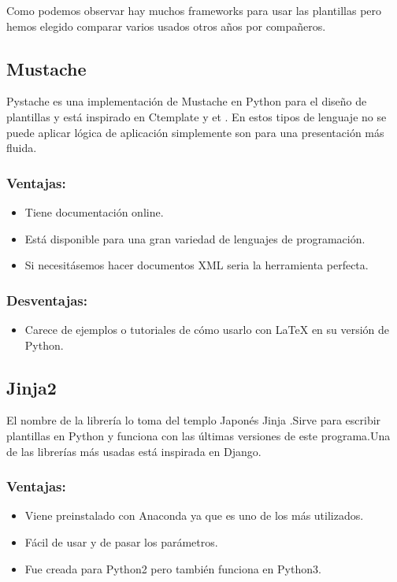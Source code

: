 Como podemos observar hay muchos frameworks para usar las plantillas pero hemos elegido comparar varios usados otros años por compañeros.
\subsection{Mustache}
Pystache es una implementación de Mustache en Python para el diseño de plantillas y está inspirado en Ctemplate \cite{GitHub:CTemplate} y et \cite{et}.
En estos tipos de lenguaje no se puede aplicar lógica de aplicación simplemente son para una presentación más fluida.

\subsubsection{Ventajas:}

\begin{itemize}
\item Tiene documentación online.
\item Está disponible para una gran variedad de lenguajes de programación.
\item Si necesitásemos hacer documentos XML seria la herramienta perfecta.
\end{itemize}

\subsubsection{Desventajas:}
\begin{itemize}
\item Carece de ejemplos o tutoriales de cómo usarlo con \LaTeX{} en su versión de Python.
\end{itemize}


\subsection{Jinja2}

El nombre de la librería lo toma del templo Japonés Jinja .Sirve para escribir  plantillas en Python y funciona con las últimas versiones de este programa.Una de las librerías más usadas está inspirada en Django. 


\subsubsection{Ventajas:}
\begin{itemize}
\item Viene preinstalado con Anaconda ya que es uno de los más utilizados.
\item Fácil de usar y de pasar los parámetros.
\item Fue creada para Python2 pero también funciona en Python3.\end{itemize}

